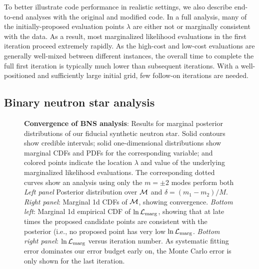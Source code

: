 \documentclass[twocolumn,prd,nofootinbib]{revtex4}
\newcommand\editremark[1]{{\color{red} #1}}
\newcommand{\mc}{{\cal M}}
\begin{document}
To better illustrate code performance in realistic settings, we also describe end-to-end analyses with
the original and modified code.     In a full analysis, many of the initially-proposed  evaluation points $\lambda$ are
either not or marginally consistent with the data.  As a result, most marginalized likelihood evaluations in the first
iteration proceed extremely rapidly.  As the high-cost and low-cost evaluations are generally well-mixed between
different instances, the overall time to complete the full first iteration is typically much lower than subsequent
iterations.   With a well-positioned and sufficiently large initial grid,  few follow-on iterations are needed.  




\subsection{Binary neutron star analysis}
\label{sec:sub:BNSFull}

\begin{figure*}

\caption{\label{fig:BNS:MultiIterate}\textbf{Convergence of BNS analysis}: Results for marginal posterior distributions
  of our fiducial synthetic neutron star.  Solid contours show credible intervals; solid one-dimensional distributions
  show marginal CDFs and PDFs for the corresponding variable; and colored points indicate the location $\lambda$ and
  value of the underlying marginalized likelihood evaluations.   The corresponding dotted curves show an analysis using
  only the $m=\pm 2$ modes \editremark{perform both} \emph{Left panel } Posterior distribution
  over  $\mc$ and
  $\delta=(m_1-m_2)/M$.    \emph{Right panel}: Marginal 1d CDFs of $\mc$, showing convergence.
\emph{Bottom left}: Marginal 1d empirical CDF of $\ln{\cal L}_{\rm marg}$, showing that at late times the proposed
candidate points are consistent with the posterior (i.e., no proposed point has very low $\ln {\cal L}_{\rm marg}$.
\emph{Bottom right panel}: $\ln {\cal L}_{\rm marg}$ versus iteration number.  As systematic fitting error dominates our
error budget early on, the Monte Carlo error is only shown for the last iteration.
}
\end{figure*}
\end{document}
